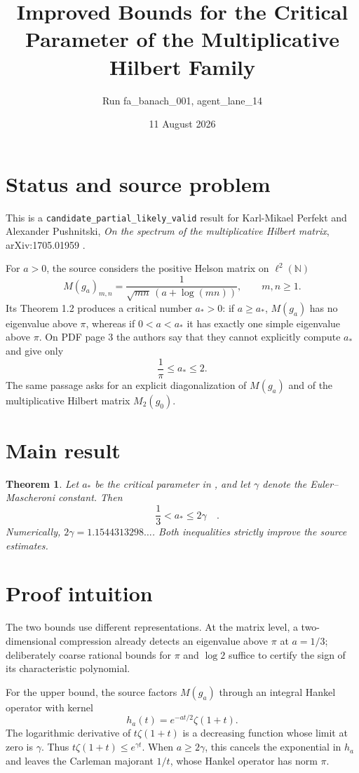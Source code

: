 \documentclass[11pt]{article}
\title{Improved Bounds for the Critical Parameter of the Multiplicative Hilbert Family}
\author{Run fa\_banach\_001, agent\_lane\_14}
\date{11 August 2026}
\newtheorem{theorem}{Theorem}
\newcommand{\N}{\mathbb N}
\begin{document}
\maketitle

\section*{Status and source problem}

This is a \texttt{candidate\_partial\_likely\_valid} result for Karl-Mikael
Perfekt and Alexander Pushnitski, \emph{On the spectrum of the multiplicative
Hilbert matrix}, arXiv:1705.01959 \cite{PP}.

For $a>0$, the source considers the positive Helson matrix on
$\ell^2(\N)$
\[
 M(g_a)_{m,n}=\frac{1}{\sqrt{mn}\,(a+\log(mn))},\qquad m,n\geq1.
\]
Its Theorem 1.2 produces a critical number $a_*>0$: if $a\geq a_*$,
$M(g_a)$ has no eigenvalue above $\pi$, whereas if $0<a<a_*$ it has exactly
one simple eigenvalue above $\pi$.  On PDF page 3 the authors say that they
cannot explicitly compute $a_*$ and give only
\[
 \frac1\pi\leq a_*\leq2.
\]
The same passage asks for an explicit diagonalization of $M(g_a)$ and of the
multiplicative Hilbert matrix $M_2(g_0)$.

\section*{Main result}

\begin{theorem}\label{thm:main}
Let $a_*$ be the critical parameter in \cite[Theorem 1.2]{PP}, and let
$\gamma$ denote the Euler--Mascheroni constant.  Then
\[
 \boxed{\quad \frac13<a_*\leq2\gamma\quad}.
\]
Numerically, $2\gamma=1.1544313298\ldots$.  Both inequalities strictly
improve the source estimates.
\end{theorem}

\section*{Proof intuition}

The two bounds use different representations.  At the matrix level, a
two-dimensional compression already detects an eigenvalue above $\pi$ at
$a=1/3$; deliberately coarse rational bounds for $\pi$ and $\log 2$ suffice
to certify the sign of its characteristic polynomial.

For the upper bound, the source factors $M(g_a)$ through an integral Hankel
operator with kernel
\[
 h_a(t)=e^{-at/2}\zeta(1+t).
\]
The logarithmic derivative of $t\zeta(1+t)$ is a decreasing function whose
limit at zero is $\gamma$.  Thus $t\zeta(1+t)\leq e^{\gamma t}$.  When
$a\geq2\gamma$, this cancels the exponential in $h_a$ and leaves the
Carleman majorant $1/t$, whose Hankel operator has norm $\pi$.
\end{document}
